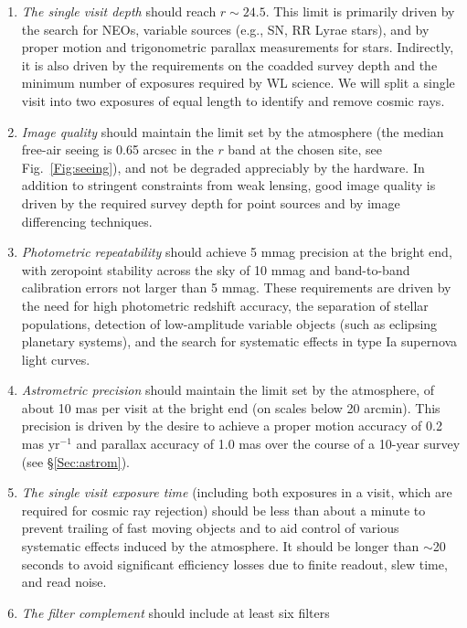 \documentclass{emulateapj}
\begin{document}
\begin{enumerate}
\item  {\it The single visit depth} should reach $r\sim24.5$. This limit is
   primarily driven by the search for NEOs, variable sources (e.g., SN,
   RR Lyrae stars), and by proper motion and trigonometric parallax 
   measurements for stars. Indirectly, it is also driven by the
   requirements on the coadded survey depth and the minimum number of 
   exposures required by WL science.  We will split a single visit
   into two exposures of equal length to identify and remove cosmic
   rays.  
\item  {\it Image quality} should maintain the limit set by the 
     atmosphere (the median free-air seeing is 0.65 arcsec in the $r$ band 
     at the chosen site, see Fig.~\ref{Fig:seeing}),
     and not be degraded appreciably by the hardware. In addition to stringent 
     constraints from weak lensing, good image quality is driven by the 
     required survey depth for point sources and by image differencing
     techniques. 
\item  {\it Photometric repeatability} should achieve 5 mmag precision
     at the bright end, with zeropoint stability across the sky of 10 mmag
     and band-to-band calibration errors not larger than 5 mmag.
     These requirements are driven by the need for high photometric redshift accuracy,
     the separation of stellar populations, detection of low-amplitude variable
     objects (such as eclipsing planetary systems), and the search for
     systematic effects in type Ia supernova light curves.
\item  {\it Astrometric precision} should maintain the limit set by 
     the atmosphere, of about 10 mas per visit at the bright end
     (on scales below 20 arcmin). This precision is driven by the desire to 
     achieve a proper motion accuracy of 0.2 mas yr$^{-1}$ and parallax accuracy of 
     1.0 mas over the course of a 10-year survey (see \S \ref{Sec:astrom}).
\item  {\it The single visit exposure time} (including both exposures in a 
    visit, which are required for cosmic ray rejection) should be less than about a minute 
    to prevent trailing of fast moving objects and to aid control 
    of various systematic effects induced by the atmosphere. It should
    be longer than $\sim$20 seconds to avoid significant efficiency losses due to
    finite readout, slew time, and read noise.
\item  {\it The filter complement} should include at least six filters

\end{enumerate}
\end{document}
